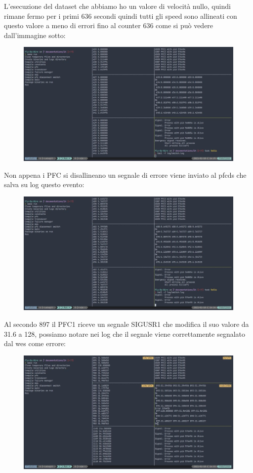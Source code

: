 \documentclass{article}
\begin{document}
\begin{flushleft}
L'esecuzione del dataset che abbiamo ho un valore di velocità nullo, quindi rimane fermo per i primi 636 secondi quindi tutti gli speed sono allineati con questo valore a meno di errori fino al counter 636 come si può vedere dall'immagine sotto:

\begin{figure}[H]
\centering
\includegraphics[width=0.8\linewidth]{images/prima.jpg}
\end{figure}

Non appena i PFC si disallineano un segnale di errore viene inviato al pfcds che salva su log questo evento:

\begin{figure}[H]
\centering
\includegraphics[width=0.8\linewidth]{images/seconda.jpg}
\end{figure}

Al secondo 897 il PFC1 riceve un segnale SIGUSR1 che modifica il suo valore da 31.6 a 128, possiamo notare nei log che il segnale viene correttamente segnalato dal wes come errore:

\begin{figure}[H]
\centering
\includegraphics[width=0.8\linewidth]{images/terza.jpg}
\end{figure}


\end{flushleft}
\end{document}
